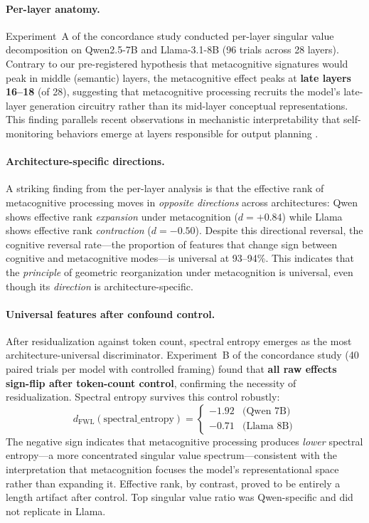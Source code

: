 \paragraph{Per-layer anatomy.}
Experiment~A of the concordance study conducted per-layer singular value decomposition on Qwen2.5-7B and Llama-3.1-8B (96 trials across 28 layers).
Contrary to our pre-registered hypothesis that metacognitive signatures would peak in middle (semantic) layers, the metacognitive effect peaks at \textbf{late layers 16--18} (of 28), suggesting that metacognitive processing recruits the model's late-layer generation circuitry rather than its mid-layer conceptual representations.
This finding parallels recent observations in mechanistic interpretability that self-monitoring behaviors emerge at layers responsible for output planning \cite{elhage2022}.

\paragraph{Architecture-specific directions.}
A striking finding from the per-layer analysis is that the effective rank of metacognitive processing moves in \emph{opposite directions} across architectures: Qwen shows effective rank \emph{expansion} under metacognition ($d = +0.84$) while Llama shows effective rank \emph{contraction} ($d = -0.50$).
Despite this directional reversal, the cognitive reversal rate---the proportion of features that change sign between cognitive and metacognitive modes---is universal at 93--94\%.
This indicates that the \emph{principle} of geometric reorganization under metacognition is universal, even though its \emph{direction} is architecture-specific.

\paragraph{Universal features after confound control.}
After \fwl residualization against token count, spectral entropy emerges as the most architecture-universal discriminator.
Experiment~B of the concordance study (40 paired trials per model with controlled framing) found that \textbf{all raw effects sign-flip after token-count control}, confirming the necessity of \fwl residualization.
Spectral entropy survives this control robustly:
\begin{equation}
  d_{\text{FWL}}(\text{spectral\_entropy}) =
  \begin{cases}
    -1.92 & \text{(Qwen 7B)} \\
    -0.71 & \text{(Llama 8B)}
  \end{cases}
  \label{eq:spectral_entropy_fwl}
\end{equation}
The negative sign indicates that metacognitive processing produces \emph{lower} spectral entropy---a more concentrated singular value spectrum---consistent with the interpretation that metacognition focuses the model's representational space rather than expanding it.
Effective rank, by contrast, proved to be entirely a length artifact after \fwl control.
Top singular value ratio was Qwen-specific and did not replicate in Llama.

